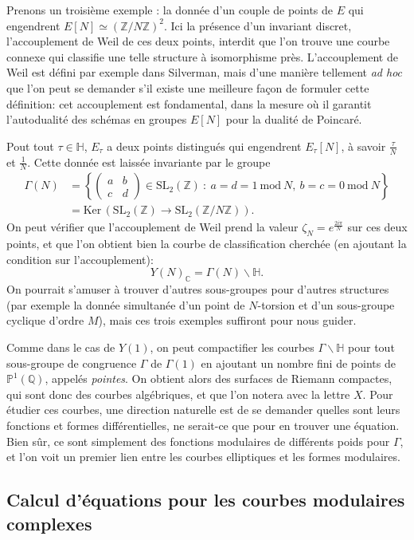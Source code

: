 \documentclass[11pt,a4paper]{article}
\newcommand{\Z}{\mathbb{Z}}
\newcommand{\C}{\mathbb{C}}
\newcommand{\Q}{\mathbb{Q}}
\renewcommand{\H}{\mathbb{H}}
\renewcommand{\P}{\mathbb{P}}
\renewcommand{\b}{\backslash}
\newcommand{\Ker}{\mathrm{Ker}\,}
\renewcommand{\mod}{\ \mathrm{mod}\ }
\theoremstyle{definition}
\begin{document}
Prenons un troisième exemple : la donnée d'un couple de points de $E$ qui engendrent $E[N] \simeq (\Z/N\Z)^2$. Ici la présence d'un invariant discret, l'accouplement de Weil de ces deux points, interdit que l'on trouve une courbe connexe qui classifie une telle structure à isomorphisme près. L'accouplement de Weil est défini par exemple dans Silverman, mais d'une manière tellement \emph{ad hoc} que l'on peut se demander s'il existe une meilleure façon de formuler cette définition: cet accouplement est fondamental, dans la mesure où il garantit l'autodualité des schémas en groupes $E[N]$ pour la dualité de Poincaré.

Pout tout $\tau\in \H$, $E_\tau$ a deux points distingués qui engendrent $E_\tau[N]$, à savoir $\frac{\tau}{N}$ et $\frac{1}{N}$. Cette donnée est laissée invariante par le groupe
$$\begin{aligned}
\Gamma(N) &= \left\{\left(
\begin{matrix}
a & b \\
c & d
\end{matrix}
\right) \in \mathrm{SL}_2(\Z)\ :\ a = d = 1 \mod{N},\ b = c = 0\mod{N}\right\} \\
 &= \Ker(\mathrm{SL}_2(\Z) \to \mathrm{SL}_2(\Z/N\Z)).
\end{aligned}$$
On peut vérifier que l'accouplement de Weil prend la valeur $\zeta_N = e^\frac{2 i \pi}{N}$ sur ces deux points, et que l'on obtient bien la courbe de classification cherchée (en ajoutant la condition sur l'accouplement):
$$Y(N)_\C = \Gamma(N) \b \H.$$
On pourrait s'amuser à trouver d'autres sous-groupes pour d'autres structures (par exemple la donnée simultanée d'un point de $N$-torsion et d'un sous-groupe cyclique d'ordre $M$), mais ces trois exemples suffiront pour nous guider.

Comme dans le cas de $Y(1)$, on peut compactifier les courbes $\Gamma \b\H$ pour tout sous-groupe de congruence $\Gamma$ de $\Gamma(1)$ en ajoutant un nombre fini de points de $\P^1(\Q)$, appelés \emph{pointes}. On obtient alors des surfaces de Riemann compactes, qui sont donc des courbes algébriques, et que l'on notera avec la lettre $X$. Pour étudier ces courbes, une direction naturelle est de se demander quelles sont leurs fonctions et formes différentielles, ne serait-ce que pour en trouver une équation. Bien sûr, ce sont simplement des fonctions modulaires de différents poids pour $\Gamma$, et l'on voit un premier lien entre les courbes elliptiques et les formes modulaires.

\subsection{Calcul d'équations pour les courbes modulaires complexes}
\end{document}
